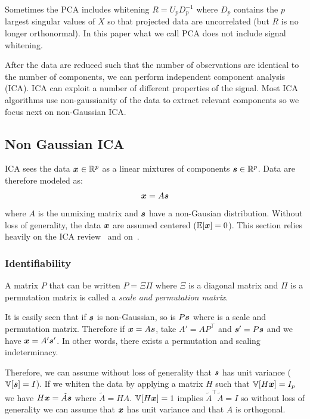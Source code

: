 Sometimes the PCA includes whitening $R = U_p D_p^{-1}$ where $D_p$ contains the
 $p$ largest singular values of $X$ so that projected data are
uncorrelated (but $R$ is no longer orthonormal). In this paper what we call PCA
does not include signal whitening.

After the data are reduced such that the number of observations are identical to
the number of components, we can perform independent component analysis (ICA).
ICA can exploit a number of different properties of the signal. Most ICA
algorithms use non-gaussianity of the data to extract relevant components so we
focus next on non-Gaussian ICA.

\subsection{Non Gaussian ICA}
ICA sees the data $\boldsymbol{x} \in \mathbb{R}^p$ as a linear mixtures of components $\boldsymbol{s} \in \mathbb{R}^p$.
Data are therefore modeled as:
\begin{align}
  \boldsymbol{x} = A \boldsymbol{s}
\end{align}
where $A$ is the unmixing matrix and $\boldsymbol{s}$ have a non-Gausian distribution.
Without loss of generality, the data $\boldsymbol{x}$ are assumed centered ($\mathbb{E}[\boldsymbol{x}] = 0$).
This section relies heavily on the ICA review~\cite{hyvarinen2000independent}
and on~\cite{cardoso1997infomax}.

\subsubsection{Identifiability}
A matrix $P$ that can be written $P =
\Xi \Pi$ where $\Xi$ is a diagonal matrix and $\Pi$ is a permutation matrix
is called a \emph{scale and permutation matrix}.

It is easily seen that if $\boldsymbol{s}$ is non-Gaussian, so is $P \boldsymbol{s}$ where  
is a scale and permutation matrix.
Therefore if $\boldsymbol{x} = A \boldsymbol{s}$, take $A' = AP^{\top}$ and $\boldsymbol{s}'=P\boldsymbol{s}$ and we have
$\boldsymbol{x} = A' \boldsymbol{s}'$.
In other words, there exists a permutation and scaling indeterminacy.

Therefore, we can assume without loss of generality that $\boldsymbol{s}$ has unit variance ($\mathbb{V}[\boldsymbol{s}] = I$).
If we whiten the data by applying a matrix $H$ such that $\mathbb{V}[H \boldsymbol{x}] = I_p$ we have $H \boldsymbol{x} = \tilde{A} \boldsymbol{s}$ where $\tilde{A} = HA$. $\mathbb{V}[H \boldsymbol{x}] = 1$ implies $\tilde{A}^{\top} \tilde{A} = I$ so without loss of generality we can assume that $\boldsymbol{x}$ has unit variance and that $A$ is orthogonal. 

